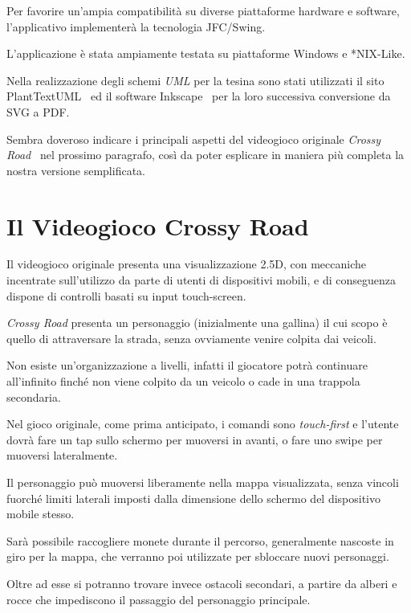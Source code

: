 \documentclass[12pt,a4paper]{report}
\begin{document}
Per favorire un'ampia compatibilità su diverse piattaforme hardware e software, l'applicativo implementerà la tecnologia JFC/Swing.

L'applicazione è stata ampiamente testata su piattaforme Windows e *NIX-Like.

Nella realizzazione degli schemi \emph{UML} per la tesina sono stati utilizzati il sito PlantTextUML~\cite{PlantTextUML} ed il software Inkscape~\cite{Inkscape} per la loro successiva conversione da SVG a PDF.

\medskip
Sembra doveroso indicare i principali aspetti del videogioco originale \emph{Crossy Road}~\cite{wiki:it:CrossyRoad,wiki:en:CrossyRoad} nel prossimo paragrafo, così da poter esplicare in maniera più completa la nostra versione semplificata.

\section{Il Videogioco Crossy Road}\label{se:gal}
Il videogioco originale presenta una visualizzazione 2.5D, con meccaniche incentrate sull'utilizzo da parte di utenti di dispositivi mobili, e di conseguenza dispone di controlli basati su input touch-screen.

\emph{Crossy Road} presenta un personaggio (inizialmente una gallina) il cui scopo è quello di attraversare la strada, senza ovviamente venire colpita dai veicoli.

Non esiste un'organizzazione a livelli, infatti il giocatore potrà continuare all'infinito finché non viene colpito da un veicolo o cade in una trappola secondaria.

Nel gioco originale, come prima anticipato, i comandi sono \emph{touch-first} e l'utente dovrà fare un tap sullo schermo per muoversi in avanti, o fare uno swipe per muoversi lateralmente.

Il personaggio può muoversi liberamente nella mappa visualizzata, senza vincoli fuorché limiti laterali imposti dalla dimensione dello schermo del dispositivo mobile stesso.

Sarà possibile raccogliere monete durante il percorso, generalmente nascoste in giro per la mappa, che verranno poi utilizzate per sbloccare nuovi personaggi.

Oltre ad esse si potranno trovare invece ostacoli secondari, a partire da alberi e rocce che impediscono il passaggio del personaggio principale.
\end{document}

